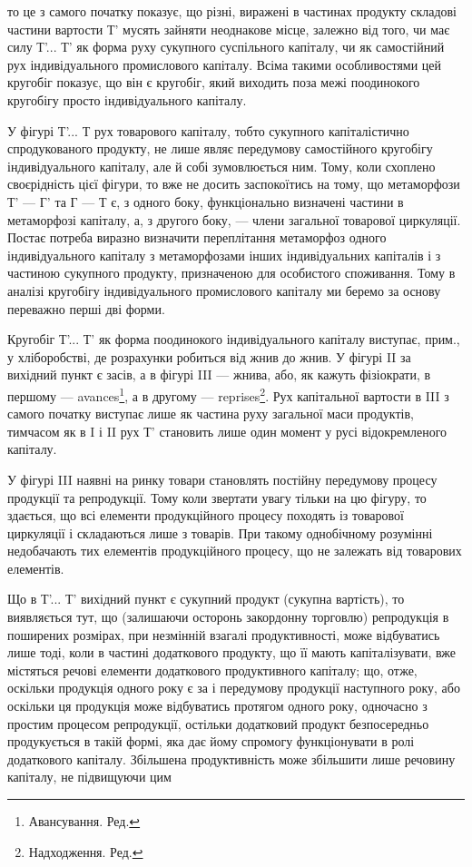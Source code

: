 то це з самого початку показує, що різні, виражені в частинах продукту складові частини вартости Т'
мусять зайняти неоднакове місце, залежно від того, чи має силу Т'... Т' як форма руху сукупного
суспільного капіталу, чи як самостійний рух індивідуального промислового капіталу. Всіма такими
особливостями цей кругобіг показує, що він є кругобіг, який виходить поза межі поодинокого кругобігу
просто індивідуального капіталу.

У фігурі Т'... Т рух товарового капіталу, тобто сукупного капіталістично спродукованого продукту, не
лише являє передумову самостійного кругобігу індивідуального капіталу, але й собі зумовлюється ним.
Тому, коли схоплено своєрідність цієї фігури, то вже не досить заспокоїтись на тому, що метаморфози
Т' — Г' та Г — Т є, з одного боку, функціонально визначені частини в метаморфозі капіталу, а, з
другого боку, — члени загальної товарової циркуляції. Постає потреба виразно визначити переплітання
метаморфоз одного індивідуального капіталу з метаморфозами інших індивідуальних капіталів і з
частиною сукупного продукту, призначеною для особистого споживання. Тому в аналізі кругобігу
індивідуального промислового капіталу ми беремо за основу переважно перші дві форми.

Кругобіг Т'... Т' як форма поодинокого індивідуального капіталу виступає, прим., у хліборобстві, де
розрахунки робиться від жнив до жнив. У фігурі II за вихідний пункт є засів, а в фігурі III — жнива,
або, як кажуть фізіократи, в першому — avances\footnote*{
Авансування. Ред.
}, а в другому — reprises\footnote*{
Надходження. Ред.
}. Рух капітальної
вартости в III з самого початку виступає лише як частина руху загальної маси продуктів, тимчасом як
в I і II рух Т' становить лише один момент у русі відокремленого капіталу.

У фігурі III наявні на ринку товари становлять постійну передумову процесу продукції та репродукції.
Тому коли звертати увагу тільки на цю фігуру, то здається, що всі елементи продукційного процесу
походять із товарової циркуляції і складаються лише з товарів. При такому однобічному розумінні
недобачають тих елементів продукційного процесу, що не залежать від товарових елементів.

Що в Т'... Т' вихідний пункт є сукупний продукт (сукупна вартість), то виявляється тут, що
(залишаючи осторонь закордонну торговлю) репродукція в поширених розмірах, при незмінній взагалі
продуктивності, може відбуватись лише тоді, коли в частині додаткового продукту, що її мають
капіталізувати, вже містяться речові елементи додаткового продуктивного капіталу; що, отже, оскільки
продукція одного року є за і передумову продукції наступного року, або оскільки ця продукція може
відбуватись протягом одного року, одночасно з простим процесом репродукції, остільки додатковий
продукт безпосередньо продукується в такій формі, яка дає йому спромогу функціонувати в ролі
додаткового капіталу. Збільшена продуктивність може збільшити лише речовину капіталу, не підвищуючи
цим